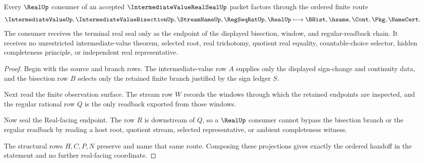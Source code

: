 \begin{theorem}
\label{thm:intermediate-value-real-seal-route}
Every $\RealUp$ consumer of an accepted $\IntermediateValueRealSealUp$ packet factors through the ordered finite route
$$
\IntermediateValueUp,\IntermediateValueBisectionUp,\StreamNameUp,\RegSeqRatUp,\RealUp
\longmapsto
\BHist,\hsame,\Cont,\Pkg,\NameCert .
$$
The consumer receives the terminal real seal only as the endpoint of the displayed bisection, window, and regular-readback chain. It receives no unrestricted intermediate-value theorem, selected root, real trichotomy, quotient real equality, countable-choice selector, hidden completeness principle, or independent real representative.
\end{theorem}
\begin{proof}
Begin with the source and branch rows. The intermediate-value row $A$ supplies only the displayed sign-change and continuity data, and the bisection row $B$ selects only the retained finite branch justified by the sign ledger $S$.

Next read the finite observation surface. The stream row $W$ records the windows through which the retained endpoints are inspected, and the regular rational row $Q$ is the only readback exported from those windows.

Now seal the Real-facing endpoint. The row $R$ is downstream of $Q$, so a $\RealUp$ consumer cannot bypass the bisection branch or the regular readback by reading a host root, quotient stream, selected representative, or ambient completeness witness.

The structural rows $H,C,P,N$ preserve and name that same route. Composing these projections gives exactly the ordered handoff in the statement and no further real-facing coordinate.
\end{proof}


